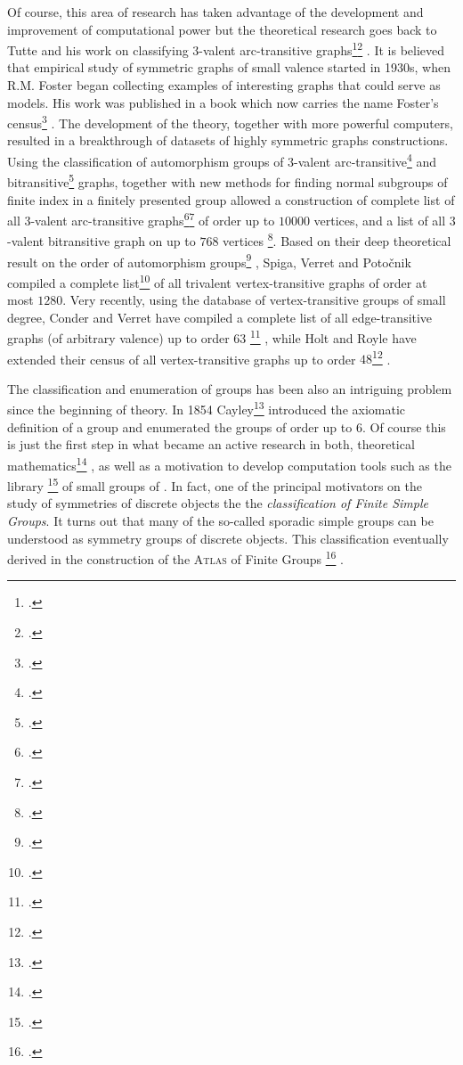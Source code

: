 Of course, this area of research has taken advantage of the development and improvement of computational power but the theoretical research goes back to Tutte and his work on classifying $3$-valent arc-transitive graphs\footcite{Tutte_1947_FamilyCubicalGraphs}\footcite{Tutte_1959_SymmetryCubicGraphs} .
It is believed that empirical study of symmetric graphs of small valence started in 1930s, when R.M. Foster  began collecting examples of interesting graphs that could serve as models.
His work was published in a book which now carries the name Foster’s census\footcite{Foster_1966_CensusTrivalentSymmetrical} .
The development of the theory, together with more powerful computers, resulted in a breakthrough of datasets of highly symmetric graphs constructions.
Using the classification of automorphism groups of $3$-valent
arc-transitive\footcite{DjokovicMiller_1980_RegularGroupsAutomorphisms} and bitransitive\footcite{Goldschmidt_1980_AutomorphismsTrivalentGraphs} graphs, together with new methods for finding normal subgroups of finite index in a finitely presented group allowed a construction of complete list of all $3$-valent arc-transitive graphs\footcite{ConderDobcsanyi_2002_TrivalentSymmetricGraphs}\footcite{Conder__TrivalentCubicSymmetric}  of order up to $10 000$ vertices, and a list of all $3$-valent bitransitive graph on up to $768$ vertices \footcite{ConderMalnicMarusicPotocnik_2006_CensusSemisymmetricCubic}.
Based on their deep theoretical result on the order of automorphism groups\footcite{PotocnikSpigaVerret_2015_BoundingOrderVertex} , Spiga, Verret and Potočnik compiled a complete list\footcite{PotocnikSpigaVerret_2015_Census4Valent}  of all trivalent vertex-transitive graphs of order at most $1280$.
Very recently, using the database of vertex-transitive groups of small degree, Conder and Verret have compiled a complete list of all edge-transitive graphs (of arbitrary valence) up to order $63$ \footcite{ConderVerret_2019_EdgeTransitiveGraphs} , while
Holt and Royle have extended their census of all vertex-transitive graphs up to order $48$\footcite{HoltRoyle_2020_CensusSmallTransitive} .

The classification and enumeration of groups has been also an intriguing problem since the beginning of theory.
In 1854 Cayley\footcite{Cayley_1854_Vii.TheoryGroups} introduced the axiomatic definition of a group and enumerated the groups of order up to $6$.
Of course this is just the first step in what became an active research in both, theoretical mathematics\footcite{BlackburnNeumannVenkataraman_2007_EnumerationFiniteGroups} , as well as a motivation to develop computation tools such as the library \smallgrp \footcite{BescheEickOBrien_2001_GroupsOrderMost} of small groups of \gap.
In fact, one of the principal motivators on the study of symmetries of discrete objects the the \emph{classification of Finite Simple Groups}. It turns out that many of the so-called sporadic simple groups can be understood as symmetry groups of discrete objects.
This classification eventually derived in the construction of the \textsc{Atlas} of Finite Groups \footcite{Conway_1986_AtlasFiniteGroups} .

